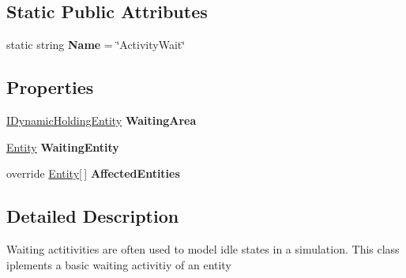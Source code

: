 \subsection*{Static Public Attributes}
\begin{DoxyCompactItemize}
\item 
static string {\bfseries Name} = \char`\"{}Activity\+Wait\char`\"{}\hypertarget{class_simulation_core_1_1_h_c_c_m_elements_1_1_activity_wait_af64475e2a7b970f9b293dc7025f1887d}{}\label{class_simulation_core_1_1_h_c_c_m_elements_1_1_activity_wait_af64475e2a7b970f9b293dc7025f1887d}

\end{DoxyCompactItemize}
\subsection*{Properties}
\begin{DoxyCompactItemize}
\item 
\hyperlink{interface_simulation_core_1_1_h_c_c_m_elements_1_1_i_dynamic_holding_entity}{I\+Dynamic\+Holding\+Entity} {\bfseries Waiting\+Area}\hypertarget{class_simulation_core_1_1_h_c_c_m_elements_1_1_activity_wait_a3a22165021b0de9b44c337ae8ed18716}{}\label{class_simulation_core_1_1_h_c_c_m_elements_1_1_activity_wait_a3a22165021b0de9b44c337ae8ed18716}

\item 
\hyperlink{class_simulation_core_1_1_h_c_c_m_elements_1_1_entity}{Entity} {\bfseries Waiting\+Entity}\hypertarget{class_simulation_core_1_1_h_c_c_m_elements_1_1_activity_wait_aa3dc23749a1982f9760a7d41229e00f8}{}\label{class_simulation_core_1_1_h_c_c_m_elements_1_1_activity_wait_aa3dc23749a1982f9760a7d41229e00f8}

\item 
override \hyperlink{class_simulation_core_1_1_h_c_c_m_elements_1_1_entity}{Entity}\mbox{[}$\,$\mbox{]} {\bfseries Affected\+Entities}\hypertarget{class_simulation_core_1_1_h_c_c_m_elements_1_1_activity_wait_abce5d9ea4d2135f1e5fdb02807ddb876}{}\label{class_simulation_core_1_1_h_c_c_m_elements_1_1_activity_wait_abce5d9ea4d2135f1e5fdb02807ddb876}

\end{DoxyCompactItemize}


\subsection{Detailed Description}
Waiting actitivities are often used to model idle states in a simulation. This class iplements a basic waiting activitiy of an entity 




